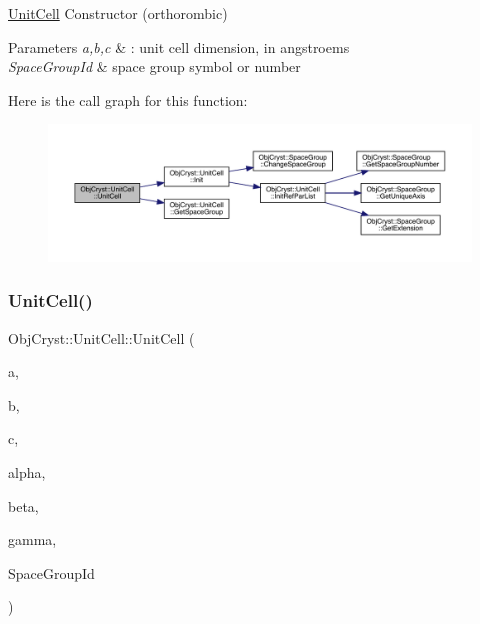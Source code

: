 \mbox{\hyperlink{class_obj_cryst_1_1_unit_cell}{Unit\+Cell}} Constructor (orthorombic) 


\begin{DoxyParams}{Parameters}
{\em a,b,c} & \+: unit cell dimension, in angstroems \\
\hline
{\em Space\+Group\+Id} & space group symbol or number \\
\hline
\end{DoxyParams}
Here is the call graph for this function\+:
\nopagebreak
\begin{figure}[H]
\begin{center}
\leavevmode
\includegraphics[width=350pt]{class_obj_cryst_1_1_unit_cell_ade3fec2bf55893d193be14001bd74f72_cgraph}
\end{center}
\end{figure}
\mbox{\label{class_obj_cryst_1_1_unit_cell_a9bb20fbe0be4e8296d400eed4dc3ae3d}} 
\subsubsection{\texorpdfstring{UnitCell()}{UnitCell()}\hspace{0.1cm}{\footnotesize\ttfamily [2/2]}}
{\footnotesize\ttfamily Obj\+Cryst\+::\+Unit\+Cell\+::\+Unit\+Cell (\begin{DoxyParamCaption}\item[{const R\+E\+AL}]{a,  }\item[{const R\+E\+AL}]{b,  }\item[{const R\+E\+AL}]{c,  }\item[{const R\+E\+AL}]{alpha,  }\item[{const R\+E\+AL}]{beta,  }\item[{const R\+E\+AL}]{gamma,  }\item[{const string \&}]{Space\+Group\+Id }\end{DoxyParamCaption})}



